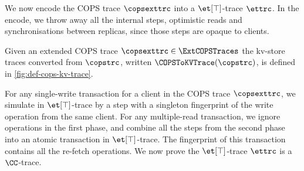 We now encode the COPS trace \( \copsexttrc \) into a \( \et[\top]\)-trace \( \ettrc \).
In the encode, we throw away all the internal steps, optimistic reads and synchronisations between replicas,
since those steps are opaque to clients.
\begin{definition}
\label{def:cops-kv-store-trace}
Given an extended COPS trace \( \copsexttrc \in \ExtCOPSTraces \)
the kv-store traces converted from \( \copstrc \),
written \( \COPSToKVTrace(\copstrc) \), is defined in \cref{fig:def-cops-kv-trace}.
\end{definition}

For any single-write transaction for a client in the COPS trace \( \copsexttrc \),
we simulate in \( \et[\top]\)-trace by a step 
with a singleton fingerprint of the write operation from the same client.
For any multiple-read transaction, we ignore operations in the first phase, 
and combine all the steps from the second phase into an atomic transaction in \( \et[\top]\)-trace.
The fingerprint of this transaction contains all the re-fetch operations.
We now prove the \( \et[\top]\)-trace \( \ettrc \) is a \( \CC \)-trace.

